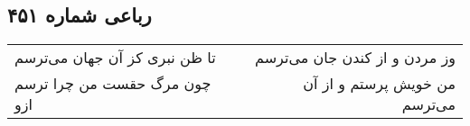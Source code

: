 \begin{center}
\section*{رباعی شماره ۴۵۱}
\label{sec:sh451}
\begin{longtable}{l p{0.5cm} r}
تا ظن نبری کز آن جهان می‌ترسم
&&
وز مردن و از کندن جان می‌ترسم
\\
چون مرگ حقست من چرا ترسم ازو
&&
من خویش پرستم و از آن می‌ترسم
\\
\end{longtable}
\end{center}
